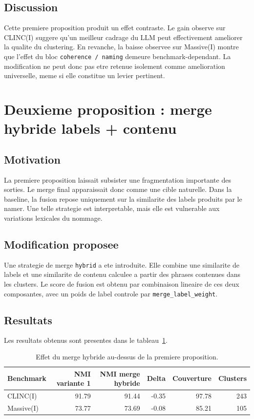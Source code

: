 \subsection{Discussion}

Cette premiere proposition produit un effet contraste. Le gain observe sur
CLINC(I) suggere qu'un meilleur cadrage du LLM peut effectivement ameliorer la
qualite du clustering. En revanche, la baisse observee sur Massive(I) montre
que l'effet du bloc \texttt{coherence / naming} demeure benchmark-dependant. La
modification ne peut donc pas etre retenue isolement comme amelioration
universelle, meme si elle constitue un levier pertinent.

\section{Deuxieme proposition : merge hybride labels + contenu}

\subsection{Motivation}

La premiere proposition laissait subsister une fragmentation importante des
sorties. Le merge final apparaissait donc comme une cible naturelle. Dans la
baseline, la fusion repose uniquement sur la similarite des labels produits par
le namer. Une telle strategie est interpretable, mais elle est vulnerable aux
variations lexicales du nommage.

\subsection{Modification proposee}

Une strategie de merge \texttt{hybrid} a ete introduite. Elle combine une
similarite de labels et une similarite de contenu calculee a partir des phrases
contenues dans les clusters. Le score de fusion est obtenu par combinaison
lineaire de ces deux composantes, avec un poids de label controle par
\texttt{merge\_label\_weight}.

\subsection{Resultats}

Les resultats obtenus sont presentes dans le
tableau~\ref{tab:second-improvement-results}.

\begin{table}[h]
  \centering
  \small
  \begin{tabular}{lrrrrr}
    \toprule
    Benchmark & NMI variante 1 & NMI merge hybride & Delta & Couverture & Clusters \\
    \midrule
    CLINC(I) & 91.79 & 91.44 & -0.35 & 97.78 & 243 \\
    Massive(I) & 73.77 & 73.69 & -0.08 & 85.21 & 105 \\
    \bottomrule
  \end{tabular}
  \caption{Effet du merge hybride au-dessus de la premiere proposition.}
  \label{tab:second-improvement-results}
\end{table}

